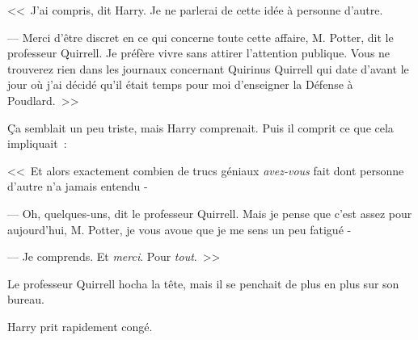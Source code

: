 <<~J'ai compris, dit Harry. Je ne parlerai de cette idée à personne d'autre.

--- Merci d'être discret en ce qui concerne toute cette affaire, M. Potter, dit le professeur Quirrell. Je préfère vivre sans attirer l'attention publique. Vous ne trouverez rien dans les journaux concernant Quirinus Quirrell qui date d'avant le jour où j'ai décidé qu'il était temps pour moi d'enseigner la Défense à Poudlard.~>>

Ça semblait un peu triste, mais Harry comprenait. Puis il comprit ce que cela impliquait~:

<<~Et alors exactement combien de trucs géniaux \emph{avez-vous} fait dont personne d'autre n'a jamais entendu -

--- Oh, quelques-uns, dit le professeur Quirrell. Mais je pense que c'est assez pour aujourd'hui, M. Potter, je vous avoue que je me sens un peu fatigué -

--- Je comprends. Et \emph{merci}. Pour \emph{tout}.~>>

Le professeur Quirrell hocha la tête, mais il se penchait de plus en plus sur son bureau.

Harry prit rapidement congé.~

